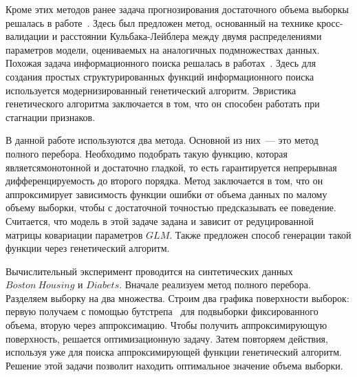 \documentclass[12pt, twoside]{article}
\begin{document}
Кроме этих методов ранее задача прогнозирования достаточного объема выборкы решалась в работе~\cite{oai:dialnet.unirioja.es:ART0000605621}. Здесь был предложен метод, основанный на технике кросс-валидации и расстоянии Кульбака-Лейблера между двумя распределениями параметров модели, оцениваемых на аналогичных подмножествах данных. Похожая задача информационного поиска решалась в работах~\cite{journals/eswa/KulunchakovS17, oai:HAL:hal-01118844v1}. Здесь для создания простых структурированных функций информационного поиска используется модернизированный генетический алгоритм. Эвристика генетического алгоритма заключается в том, что он способен работать при стагнации признаков.

В данной работе используются два метода. Основной из них~--- это метод полного перебора. Необходимо подобрать такую функцию, которая являетсямонотонной и достаточно гладкой, то есть гарантируется непрерывная дифференцируемость до второго порядка. Метод заключается в том, что он аппроксимирует зависимость функции ошибки от объема данных по малому объему выборки, чтобы с достаточной точностью предсказывать ее поведение. Считается, что модель в этой задаче задана и зависит от редуцированной матрицы ковариации параметров $GLM$. Также предложен способ генерации такой функции через генетический алгоритм.



Вычислительный эксперимент проводится на синтетических данных $Boston\ Housing$ и $Diabets$. Вначале реализуем метод полного перебора. Разделяем выборку на два множества. Строим два графика поверхности выборок: первую получаем с помощью бутстрепа~\cite{Bishop06} для подвыборки фиксированного объема, вторую через аппроксимацию. Чтобы получить аппроксимирующую поверхность, решается оптимизационную задачу. Затем повторяем действия, используя уже для поиска аппроксимирующей функции генетический алгоритм. Решение этой задачи позволит находить оптимальное значение объема выборки. 
\end{document}
